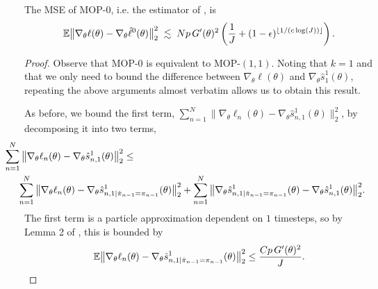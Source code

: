 \begin{cor}
    The MSE of MOP-$0$, i.e. the estimator of \cite{naesseth18}, is
    \begin{equation}
        \mathbb{E}\big\|\nabla_\theta\ell(\theta) - \nabla_\theta \hat\ell^0(\theta)\big\|_2^2 \; \lesssim 
        \; Np \, G'(\theta)^2\left(\frac{1}{J}+(1-\epsilon)^{\lfloor 1/(c\log(J)) \rfloor}\right).
    \end{equation}
\end{cor}
\begin{proof}
    Observe that MOP-$0$ is equivalent to MOP-$(1,1)$. Noting that $k=1$ and that we only need to bound the difference between $\nabla_\theta \ell(\theta)$ and $\nabla_\theta \hat s_1^1(\theta)$, repeating the above arguments almost verbatim allows us to obtain this result. 

    
As before, we bound the first term, $\sum_{n=1}^N\|\nabla_\theta\ell_n(\theta) - \nabla_\theta\hat s_{n,1}^1(\theta)\|_2^2$, by decomposing it into two terms, 
\begin{eqnarray} \nonumber
\hspace{-10mm} \sum_{n=1}^N\big\|\nabla_\theta\ell_n(\theta) - \nabla_\theta\hat s_{n,1}^1(\theta)\big\|_2^2 &\leq 
\\ &&\hspace{-45mm} 
\sum_{n=1}^N \big\|\nabla_\theta\ell_n(\theta) - \nabla_\theta\hat s_{n,1|\hat\pi_{n-1}=\pi_{n-1}}^1(\theta)\big\|_2^2 + \sum_{n=1}^N \big\|\nabla_\theta\hat s_{n,1|\hat\pi_{n-1}=\pi_{n-1}}^1(\theta) - \nabla_\theta\hat s_{n,1}^1(\theta)\big\|_2^2.
\end{eqnarray}
The first term is a particle approximation dependent on $1$ timesteps, so by Lemma 2 of \cite{karjalainen23}, this is bounded by
\begin{equation}\mathbb{E}\big\|\nabla_\theta\ell_n(\theta) - \nabla_\theta\hat s_{n,1|\hat\pi_{n-1}=\pi_{n-1}}^1(\theta)\big\|_2^2 \leq \frac{Cp \, G'(\theta)^2}{J}.\end{equation}


\end{proof}
